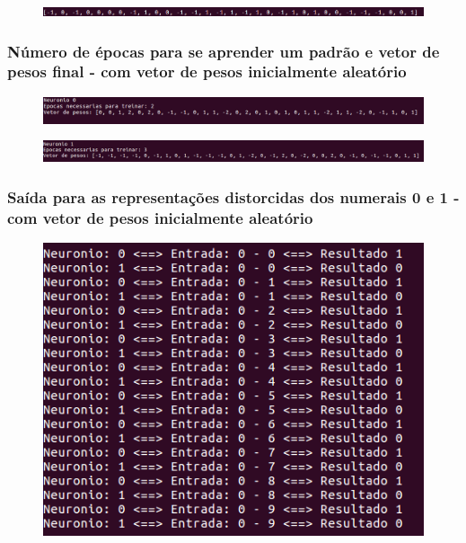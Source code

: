 \documentclass[hidelinks,12pt]{article}
\begin{document}
		\begin{figure}[!h]
			\centering
			\includegraphics[scale=0.5]{Figures/E2PI1.png}
		\end{figure}

		\subsubsection{Número de épocas para se aprender um padrão e vetor de pesos final - com vetor de pesos inicialmente aleatório}
		
		\begin{figure}[!h]
			\centering
			\includegraphics[scale=0.4]{Figures/E2PE0R.png}
		\end{figure}
		
		\begin{figure}[!h]
			\centering
			\includegraphics[scale=0.4]{Figures/E2PE1R.png}
		\end{figure}
		
		\newpage
		
		\subsubsection{Saída para as representações distorcidas dos numerais 0 e 1 - com vetor de pesos inicialmente aleatório}
		
		\begin{figure}[!h]
			\centering
			\includegraphics[scale=0.7]{Figures/E2S0R.png}
		\end{figure}
		
\end{document}
